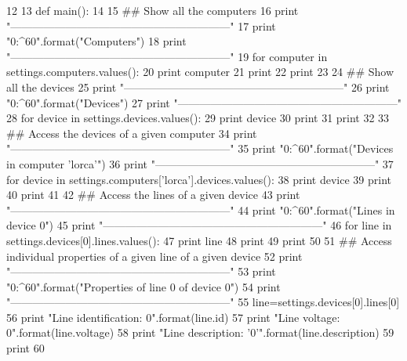 \begin{DoxyCode}
12 
13 def main():
14 
15     ## Show all the computers
16     print "------------------------------------------------------------"
17     print "{0:^60}".format("Computers")
18     print "------------------------------------------------------------"
19     for computer in settings.computers.values():
20         print computer
21     print
22     print
23 
24     ## Show all the devices
25     print "------------------------------------------------------------"
26     print "{0:^60}".format("Devices")
27     print "------------------------------------------------------------"
28     for device in settings.devices.values():
29         print device
30     print
31     print
32     
33     ## Access the devices of a given computer
34     print "------------------------------------------------------------"
35     print "{0:^60}".format("Devices in computer 'lorca'")
36     print "------------------------------------------------------------"
37     for device in settings.computers['lorca'].devices.values():
38         print device
39     print
40     print
41 
42     ## Access the lines of a given device
43     print "------------------------------------------------------------"
44     print "{0:^60}".format("Lines in device 0")
45     print "------------------------------------------------------------"
46     for line in settings.devices[0].lines.values():
47         print line
48     print
49     print
50 
51     ## Access individual properties of a given line of a given device
52     print "------------------------------------------------------------"
53     print "{0:^60}".format("Properties of line 0 of device 0")
54     print "------------------------------------------------------------"
55     line=settings.devices[0].lines[0]
56     print "Line identification: {0}".format(line.id)
57     print "Line voltage: {0}".format(line.voltage)
58     print "Line description: '{0}'".format(line.description)
59     print
60 

\end{DoxyCode}
